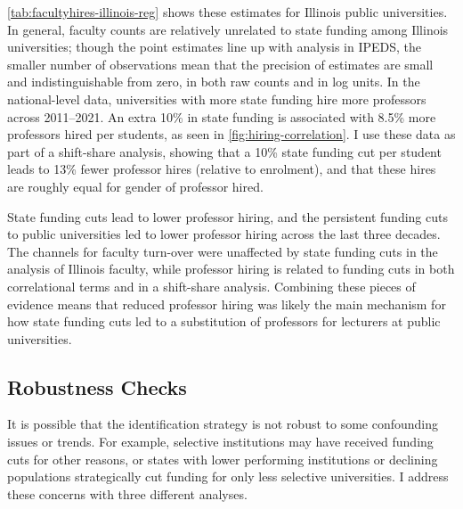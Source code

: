 \autoref{tab:facultyhires-illinois-reg} shows these estimates for Illinois public universities.
In general, faculty counts are relatively unrelated to state funding among Illinois universities; though the point estimates line up with analysis in IPEDS, the smaller number of observations mean that the precision of estimates are small and indistinguishable from zero, in both raw counts and in log units.
In the national-level \cite{wapman2022quantifying} data, universities with more state funding hire more professors across 2011--2021.
An extra 10\% in state funding is associated with 8.5\% more professors hired per students, as seen in \autoref{fig:hiring-correlation}.
I use these data as part of a shift-share analysis, showing that a 10\% state funding cut per student leads to 13\% fewer professor hires (relative to enrolment), and that these hires are roughly equal for gender of professor hired.

State funding cuts lead to lower professor hiring, and the persistent funding cuts to public universities led to lower professor hiring across the last three decades.
The channels for faculty turn-over were unaffected by state funding cuts in the analysis of Illinois faculty, while professor hiring is related to funding cuts in both correlational terms and in a shift-share analysis.
Combining these pieces of evidence means that reduced professor hiring was likely the main mechanism for how state funding cuts led to a substitution of professors for lecturers at public universities.

\subsection{Robustness Checks}
\label{sec:results-robustness}
It is possible that the identification strategy is not robust to some confounding issues or trends.
For example, selective institutions may have received funding cuts for other reasons, or states with lower performing institutions or declining populations strategically cut funding for only less selective universities.
I address these concerns with three different analyses.

